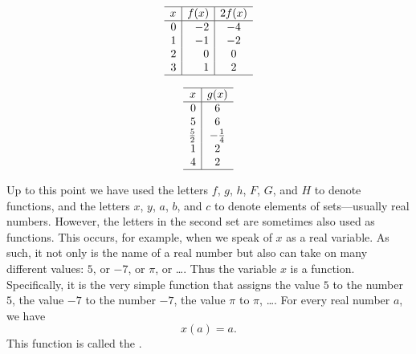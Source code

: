 \begin{table}
\[
\begin{array}{r|r|c}
\hline
  x   &  f(x)  &  2f(x)  \\
\hline
  0   &  -2    &  -4     \\
  1   &  -1    &  -2     \\
  2   &   0    &   0     \\
  3   &   1    &   2     \\
\hline
\end{array}
\]
\caption{}
\label{table 1.3}
\end{table}

\begin{table}
\centering
\[
\begin{array}{r|c}
\hline 
x               &  g(x)     \\
\hline 
0               &  6        \\ 
5               &  6        \\
\frac{5}{2}     &  -\frac{1}{4}   \\
1               &  2        \\
4               &  2        \\
\hline
\end{array}
\]
\caption{}
\label{table 1.4}
\end{table}

Up to this point
we have used the letters
$f$, $g$, $h$, $F$, $G$, and $H$
to denote functions,
and the letters $x$, $y$, $a$, $b$, and $c$
to denote elements of sets---usually real numbers.
However, the letters in the second set
are sometimes also used as functions.
This occurs, for example,
when we speak of $x$ as a real variable.
As such, it not only is the name of a real number
but also can take on many different values:
$5$, or $-7$, or $\pi$, or \ldots.
Thus the variable $x$ is a function.
Specifically, it is the very simple function
that assigns the value $5$ to the number $5$,
the value $-7$ to the number $-7$,
the value $\pi$ to $\pi$, \ldots.
For every real number $a$, we have
\[
x(a) = a.
\]
This function is called the .

